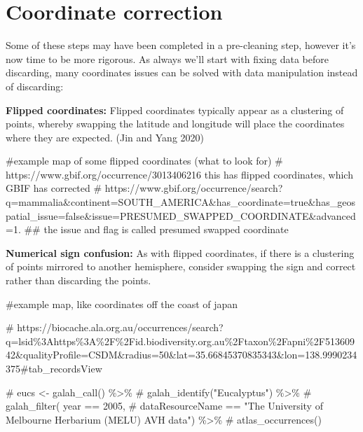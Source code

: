 \documentclass[
  letterpaper,
  DIV=11,
  numbers=noendperiod,
  oneside]{scrreprt}
\newenvironment{Shaded}{\begin{snugshade}}{\end{snugshade}}
\newcommand{\CommentTok}[1]{\textcolor[rgb]{0.37,0.37,0.37}{#1}}
\begin{document}
\hypertarget{coordinate-correction}{%
\section{Coordinate correction}\label{coordinate-correction}}

Some of these steps may have been completed in a pre-cleaning step,
however it's now time to be more rigorous. As always we'll start with
fixing data before discarding, many coordinates issues can be solved
with data manipulation instead of discarding:

\textbf{Flipped coordinates:} Flipped coordinates typically appear as a
clustering of points, whereby swapping the latitude and longitude will
place the coordinates where they are expected. (Jin and Yang 2020)

\begin{Shaded}
\begin{Highlighting}[]
\CommentTok{\#example map of some flipped coordinates (what to look for) }
\CommentTok{\# https://www.gbif.org/occurrence/3013406216 this has flipped coordinates, which GBIF has corrected}
\CommentTok{\# https://www.gbif.org/occurrence/search?q=mammalia\&continent=SOUTH\_AMERICA\&has\_coordinate=true\&has\_geospatial\_issue=false\&issue=PRESUMED\_SWAPPED\_COORDINATE\&advanced=1. \#\# the issue and flag is called \textquotesingle{}presumed swapped coordinate\textquotesingle{} }
\end{Highlighting}
\end{Shaded}

\textbf{Numerical sign confusion:} As with flipped coordinates, if there
is a clustering of points mirrored to another hemisphere, consider
swapping the sign and correct rather than discarding the points.

\begin{Shaded}
\begin{Highlighting}[]
\CommentTok{\#example map, like coordinates off the coast of japan}

\CommentTok{\# https://biocache.ala.org.au/occurrences/search?q=lsid\%3Ahttps\%3A\%2F\%2Fid.biodiversity.org.au\%2Ftaxon\%2Fapni\%2F51360942\&qualityProfile=CSDM\&radius=50\&lat=35.66845370835343\&lon=138.9990234375\#tab\_recordsView}

\CommentTok{\# eucs \textless{}{-} galah\_call() \%\textgreater{}\% }
\CommentTok{\#  galah\_identify("Eucalyptus") \%\textgreater{}\%}
\CommentTok{\#  galah\_filter( year == 2005, }
\CommentTok{\#             dataResourceName == "The University of Melbourne Herbarium (MELU) AVH data") \%\textgreater{}\%}
\CommentTok{\#  atlas\_occurrences()}
\end{Highlighting}
\end{Shaded}
\end{document}
